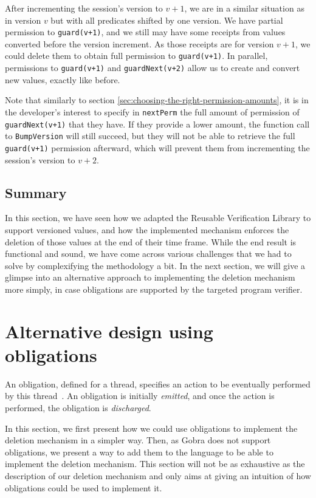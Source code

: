 After incrementing the session's version to $v+1$, we are in a similar situation as in version $v$ but with all predicates shifted by one version.
We have partial permission to \texttt{guard(v+1)}, and we still may have some receipts from values converted before the version increment.
As those receipts are for version $v+1$, we could delete them to obtain full permission to \texttt{guard(v+1)}.
In parallel, permissions to \texttt{guard(v+1)} and \texttt{guardNext(v+2)} allow us to create and convert new values, exactly like before.

Note that similarly to section \ref{sec:choosing-the-right-permission-amounts}, it is in the developer's interest to specify in \texttt{nextPerm} the full amount of permission of \texttt{guardNext(v+1)} that they have. If they provide a lower amount, the function call to \texttt{BumpVersion} will still succeed, but they will not be able to retrieve the full \texttt{guard(v+1)} permission afterward, which will prevent them from incrementing the session's version to $v+2$.

\subsection*{Summary}
In this section, we have seen how we adapted the Reusable Verification Library to support versioned values, and how the implemented mechanism enforces the deletion of those values at the end of their time frame.
While the end result is functional and sound, we have come across various challenges that we had to solve by complexifying the methodology a bit.
In the next section, we will give a glimpse into an alternative approach to implementing the deletion mechanism more simply, in case obligations are supported by the targeted program verifier.

\section{Alternative design using obligations}
\label{sec:alternative-design-using-obligations}

An obligation, defined for a thread, specifies an action to be eventually performed by this thread~\cite{}. An obligation is initially \emph{emitted}, and once the action is performed, the obligation is \emph{discharged}.

In this section, we first present how we could use obligations to implement the deletion mechanism in a simpler way.
Then, as Gobra does not support obligations, we present a way to add them to the language to be able to implement the deletion mechanism.
This section will not be as exhaustive as the description of our deletion mechanism and only aims at giving an intuition of how obligations could be used to implement it.

